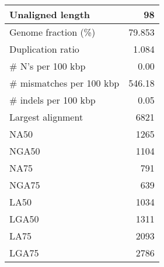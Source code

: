 \documentclass[12pt,a4paper]{article}
\begin{document}
\begin{table}[ht]
\begin{center}
\begin{tabular}{|l*{1}{|r}|}
Unaligned length & 98 \\ \hline
Genome fraction (\%) & 79.853 \\ \hline
Duplication ratio & 1.084 \\ \hline
\# N's per 100 kbp & 0.00 \\ \hline
\# mismatches per 100 kbp & 546.18 \\ \hline
\# indels per 100 kbp & 0.05 \\ \hline
Largest alignment & 6821 \\ \hline
NA50 & 1265 \\ \hline
NGA50 & 1104 \\ \hline
NA75 & 791 \\ \hline
NGA75 & 639 \\ \hline
LA50 & 1034 \\ \hline
LGA50 & 1311 \\ \hline
LA75 & 2093 \\ \hline
LGA75 & 2786 \\ \hline
\end{tabular}
\end{center}
\end{table}
\end{document}
